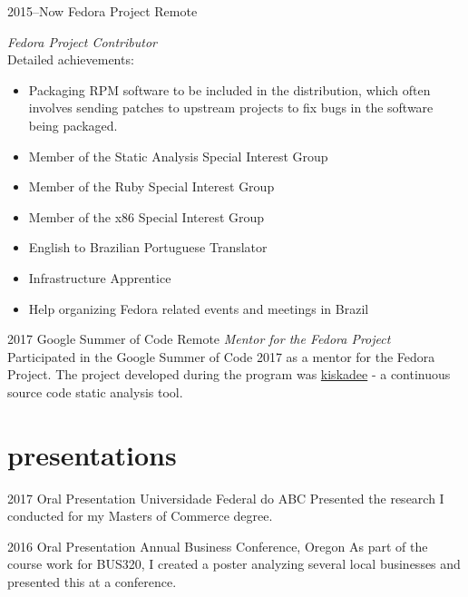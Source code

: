 \documentclass[]{friggeri-cv} %
\begin{document}
\begin{entrylist}

\entry
{2015--Now}
{Fedora Project}
{Remote}
{\emph{Fedora Project Contributor} \\
Detailed achievements:
  \begin{itemize}
    \item Packaging RPM software to be included in the distribution, which often involves sending patches to upstream projects to fix bugs in the software being packaged.
    \item Member of the Static Analysis Special Interest Group
    \item Member of the Ruby Special Interest Group
    \item Member of the x86 Special Interest Group
    \item English to Brazilian Portuguese Translator
    \item Infrastructure Apprentice
    \item Help organizing Fedora related events and meetings in Brazil
  \end{itemize}}


\entry

{2017}
{Google Summer of Code}
{Remote}
{\emph{Mentor for the Fedora Project} \\
  Participated in the Google Summer of Code 2017 as a mentor for the Fedora Project. The project developed during the program was \href{pagure.io/kiskadee}{kiskadee} - a continuous source code static analysis tool.}


\end{entrylist}


\section{presentations}

\begin{entrylist}


\entry
{2017}
{Oral Presentation}
{Universidade Federal do ABC}
{Presented the research I conducted for my Masters of Commerce degree.}


\entry
{2016}
{Oral Presentation}
{Annual Business Conference, Oregon}
{As part of the course work for BUS320, I created a poster analyzing several local businesses and presented this at a conference.}


\end{entrylist}
\end{document}
